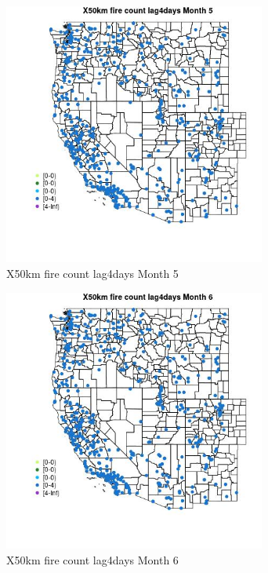 \begin{figure} 
\centering  
\includegraphics[width=0.77\textwidth]{Code_Outputs/Report_ML_input_PM25_Step4_part_e_de_duplicated_aves_compiled_2019-05-14wNAs_MapObsMo5X50km_fire_count_lag4days.jpg} 
\caption{\label{fig:Report_ML_input_PM25_Step4_part_e_de_duplicated_aves_compiled_2019-05-14wNAsMapObsMo5X50km_fire_count_lag4days}X50km fire count lag4days Month 5} 
\end{figure} 
 

\begin{figure} 
\centering  
\includegraphics[width=0.77\textwidth]{Code_Outputs/Report_ML_input_PM25_Step4_part_e_de_duplicated_aves_compiled_2019-05-14wNAs_MapObsMo6X50km_fire_count_lag4days.jpg} 
\caption{\label{fig:Report_ML_input_PM25_Step4_part_e_de_duplicated_aves_compiled_2019-05-14wNAsMapObsMo6X50km_fire_count_lag4days}X50km fire count lag4days Month 6} 
\end{figure} 
 

